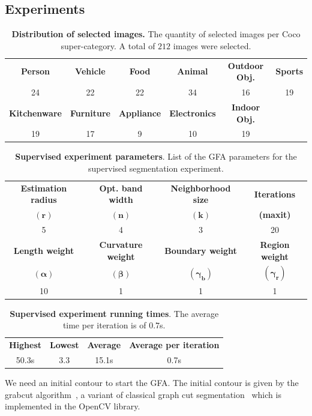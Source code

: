 \documentclass[review]{siamart220329}
\begin{document}
\subsection{Experiments}
%
%
\begin{table}[h!]
\footnotesize
    \caption{\textbf{Distribution of selected images.} The quantity of selected
    images per Coco super-category. A total of $212$ images were
    selected.}\label{tab:image-categories-distribution}
\begin{tabular}{cccccc}
\textbf{Person} & \textbf{Vehicle} & \textbf{Food} & \textbf{Animal} & \textbf{Outdoor Obj.} & \textbf{Sports} \\
24 & 22 & 22 & 34 & 16 & 19 \\[1em]
\textbf{Kitchenware} & \textbf{Furniture} & \textbf{Appliance} & \textbf{Electronics} & \textbf{Indoor Obj.} & \\
19 & 17 & 9 & 10 & 19 &
\end{tabular}
\end{table}
%
%
\begin{table}[h!]
\center
\footnotesize
\caption{\textbf{Supervised experiment parameters}. List of the GFA
parameters for the supervised segmentation
experiment.}
\label{tab:coco-experiment-parameter}
\begin{tabular}{cccc}
\textbf{Estimation radius} & \textbf{Opt. band width} & \textbf{Neighborhood size} & \textbf{Iterations} \\
$\mathbf{(r)}$ & $\mathbf{(n)}$ & $\mathbf{(k)}$ & \textbf{(maxit)}\\
5 & 4 & 3 & 20\\[1em]
\textbf{Length weight} & \textbf{Curvature weight} & \textbf{Boundary weight} & \textbf{Region weight}\\
$\boldsymbol{(\alpha)}$ & $\boldsymbol{(\beta)}$ & $\boldsymbol{(\gamma_b)}$ & $\boldsymbol{(\gamma_r)}$\\
10 & 1 & 1 & 1
\end{tabular}
\end{table}
%
%
\begin{table}[h!]
\footnotesize
\caption{\textbf{Supervised experiment running times}. The average time per
iteration is of $0.7$s.}
\label{tab:coco-experiment-running-time}
\center
\begin{tabular}{cccc}
\textbf{Highest} & \textbf{Lowest} & \textbf{Average} & \textbf{Average per iteration} \\
50.3s & 3.3 & 15.1s & 0.7s\\
\end{tabular}
\end{table}
%
%
We need an initial contour to start the GFA. The initial contour is given by the
grabcut algorithm~\cite{rother04grabcut}, a variant of classical graph cut
segmentation~\cite{boykov01graphcut} which is implemented in the OpenCV library.
\end{document}
